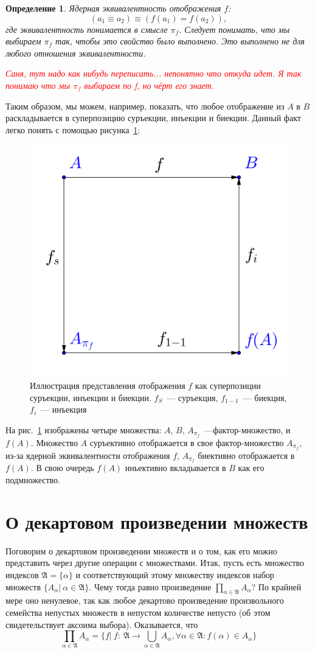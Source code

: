 \documentclass[a4paper, 12pt]{report}
\newtheorem{definition}{Определение}[chapter]
\begin{document}
\begin{definition}
Ядерная эквивалентность отображения $f$:
\[
(a_1\equiv a_2)\equiv(f(a_1)=f(a_2)),
\]
где эквивалентность понимается в смысле $\pi_f$. Следует понимать, что мы выбираем $\pi_f$ так, чтобы это свойство было выполнено. Это выполнено не для любого отношения эквивалентности.

\textcolor{red}{Саня, тут надо как нибудь переписать... непонятно что откуда идет. Я так понимаю что мы $\pi_f$ выбираем по f, но чёрт его знает.}
\end{definition}

Таким образом, мы можем, например, показать, что любое отображение из $A$ в $B$ раскладывается в суперпозицию суръекции, инъекции и биекции. Данный факт легко понять с помощью рисунка~\ref{fig::superpos}:

\begin{figure}[htbp]
\centering
\includegraphics[width=0.6\linewidth]{lect2/InectBiectSuriect.png}
\caption{Иллюстрация представления отображения $f$ как суперпозиции суръекции, инъекции и биекции. $f_S$~--- суръекция, $f_{1-1}$~--- биекция, $f_i$~--- инъекция}
\label{fig::superpos}
\end{figure}

На рис.~\ref{fig::superpos} изображены четыре множества: $A$, $B$, $A_{\pi_f}$~---фактор-множество, и $f(A)$. Множество $A$ суръективно отображается в свое фактор-множество $A_{\pi_f}$, из-за ядерной эквивалентности отображения $f$, $A_{\pi_f}$ биективно отображается в $f(A)$. В свою очередь $f(A)$ иньективно вкладывается в $B$ как его подмножество.

\section{О декартовом произведении множеств}
Поговорим о декартовом произведении множеств и о том, как его можно представить через другие операции с множествами. Итак, пусть есть множество индексов $\mathfrak{A} = \{\alpha\}$ и соответствующий этому множеству индексов набор множеств $\{A_{\alpha}|\ \alpha \in \mathfrak{A}\}$. Чему тогда равно произведение $\prod_{\alpha \in \mathfrak{A}}A_{\alpha}$? По крайней мере оно ненулевое, так как любое декартово произведение произвольного семейства непустых множеств в непустом количестве непусто (об этом свидетельствует аксоима выбора). Оказывается, что
\[
\prod_{\alpha \in \mathfrak{A}}A_{\alpha} = \{f|\ f:\ \mathfrak{A}\rightarrow\bigcup_{\alpha \in \mathfrak{A}}A_{\alpha}, \forall\alpha\in\mathfrak{A}: f(\alpha)\in A_{\alpha}\}
\]
\end{document}
